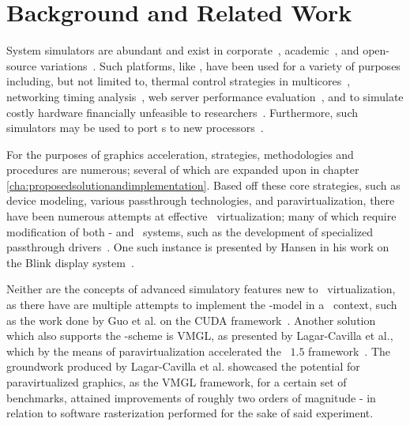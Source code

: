 
\chapter{Background and Related Work}
\label{cha:backgroundandrelatedwork}
System simulators are abundant and exist in corporate~, academic~, and open-source variations~.
Such platforms, like \dvttermsimics , have been used for a variety of purposes including, but not limited to, thermal control strategies in multicores~, networking timing analysis~, web server performance evaluation~, and to simulate costly hardware financially unfeasible to researchers~.
Furthermore, such simulators may be used to port \dvttermos s to new processors~.

For the purposes of graphics acceleration, strategies, methodologies and procedures are numerous; several of which are expanded upon in chapter \ref{cha:proposedsolutionandimplementation}.
Based off these core strategies, such as device modeling, various passthrough technologies, and paravirtualization, there have been numerous attempts at effective \dvttermgpu\ virtualization; many of which require modification of both \dvttermtarget - and \dvttermhost\ systems, such as the development of specialized passthrough drivers~.
One such instance is presented by Hansen in his work on the Blink display system~.

Neither are the concepts of advanced simulatory features new to \dvttermgpu\ virtualization, as there have are multiple attempts to implement the \dvttermcheckpointrestart -model in a \dvttermgpu\ context, such as the work done by Guo et al. on the CUDA framework~.
Another solution which also supports the \dvttermcheckpointrestart -scheme is VMGL, as presented by Lagar-Cavilla et al., which by the means of paravirtualization accelerated the \dvttermopengl\ $1.5$ framework~.
The groundwork produced by Lagar-Cavilla et al. showcased the potential for paravirtualized graphics, as the VMGL framework, for a certain set of benchmarks, attained improvements of roughly two orders of magnitude - in relation to software rasterization performed for the sake of said experiment.

